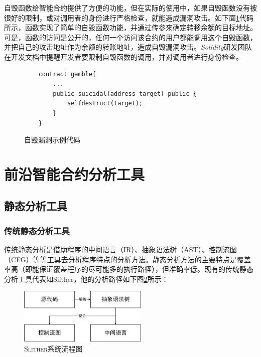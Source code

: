 自毁函数给智能合约提供了方便的功能，但在实际的使用中，如果自毁函数没有被很好的限制，或对调用者的身份进行严格检查，就能造成漏洞攻击。如下面\ref{fig:suicidal_vul}代码所示，函数实现了简单的自毁函数功能，并通过传参来确定转移余额的目标地址。可是，函数的访问是公开的，任何一个访问该合约的用户都能调用这个自毁函数，并把自己的攻击地址作为余额的转账地址，造成自毁漏洞攻击。\emph{Solidity}研发团队在开发文档中提醒开发者要限制自毁函数的调用，并对调用者进行身份检查。

\begin{figure}
\begin{minipage}[htb]{1.0\linewidth}
    \begin{lstlisting}
    contract gamble{
        ...
        public suicidal(address target) public {
            selfdestruct(target);
        }
    }
    \end{lstlisting}
\end{minipage}
\vspace{-5mm}
\caption{自毁漏洞示例代码}
\label{fig:suicidal_vul}
\end{figure}


\section{前沿智能合约分析工具}

\subsection{静态分析工具}

\subsubsection{传统静态分析工具}

传统静态分析是借助程序的中间语言（IR）、抽象语法树（AST）、控制流图（CFG）等等工具去分析程序特点的分析方法。静态分析方法的主要特点是覆盖率高（即能保证覆盖程序的尽可能多的执行路径），但准确率低。现有的传统静态分析工具代表如Slither，他的分析路径如下图\ref{fig:slither_proccess}所示：

\begin{figure}[h]
\vspace{+2mm}
  \centering
  \includegraphics[width=0.55\textwidth]{figures/slither_process.png}
  \caption{\textsc{Slither}系统流程图}
  \vspace{-5mm}
  \label{fig:slither_proccess}
\end{figure}

